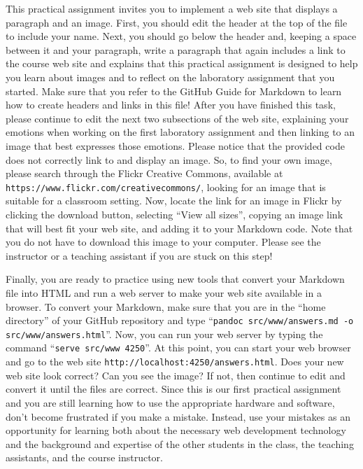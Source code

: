 \documentclass[11pt]{article}
\newcommand{\command}[1]{``\lstinline{#1}''}
\newcommand{\url}[1]{\lstinline{#1}}
\begin{document}
This practical assignment invites you to implement a web site that displays a paragraph and an image. First, you should
edit the header at the top of the file to include your name. Next, you should go below the header and, keeping a space
between it and your paragraph, write a paragraph that again includes a link to the course web site and explains that
this practical assignment is designed to help you learn about images and to reflect on the laboratory assignment that
you started. Make sure that you refer to the GitHub Guide for Markdown to learn how to create headers and links in this
file! After you have finished this task, please continue to edit the next two subsections of the web site, explaining
your emotions when working on the first laboratory assignment and then linking to an image that best expresses those
emotions. Please notice that the provided code does not correctly link to and display an image. So, to find your own
image, please search through the Flickr Creative Commons, available at \url{https://www.flickr.com/creativecommons/},
looking for an image that is suitable for a classroom setting. Now, locate the link for an image in Flickr by clicking
the download button, selecting ``View all sizes'', copying an image link that will best fit your web site, and adding it
to your Markdown code. Note that you do not have to download this image to your computer. Please see the instructor or a
teaching assistant if you are stuck on this step!

Finally, you are ready to practice using new tools that convert your Markdown file into HTML and run a web server to
make your web site available in a browser. To convert your Markdown, make sure that you are in the ``home directory'' of
your GitHub repository and type \command{pandoc src/www/answers.md -o src/www/answers.html}. Now, you can run your web
server by typing the command \command{serve src/www 4250}. At this point, you can start your web browser and go to the
web site \url{http://localhost:4250/answers.html}. Does your new web site look correct? Can you see the image? If not,
then continue to edit and convert it until the files are correct. Since this is our first practical assignment and you
are still learning how to use the appropriate hardware and software, don't become frustrated if you make a mistake.
Instead, use your mistakes as an opportunity for learning both about the necessary web development technology and the
background and expertise of the other students in the class, the teaching assistants, and the course instructor.
\end{document}
